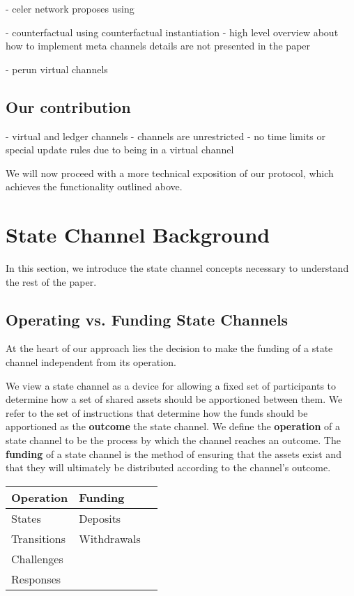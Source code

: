 \documentclass{article}
\begin{document}
- celer network proposes using 

- counterfactual using counterfactual instantiation
- high level overview about how to implement meta channels details are not presented in the paper

- perun virtual channels



\subsection{Our contribution}

- virtual and ledger channels
- channels are unrestricted
- no time limits or special update rules due to being in a virtual channel

We will now proceed with a more technical exposition of our protocol, which achieves the functionality outlined above.

\section{State Channel Background}

In this section, we introduce the state channel concepts necessary to understand the rest of the paper.

\subsection{Operating vs. Funding State Channels}

At the heart of our approach lies the decision to make the funding of a state channel independent from its operation.

We view a state channel as a device for allowing a fixed set of participants to determine how a set of shared assets should be apportioned between them.
We refer to the set of instructions that determine how the funds should be apportioned as the  \textbf{outcome} the state channel.
We define the \textbf{operation} of a state channel to be the process by which the channel reaches an outcome. 
The \textbf{funding} of a state channel is the method of ensuring that the assets exist and that they will ultimately be distributed according to the channel's outcome.

\begin{table}[]
  \begin{tabular}{|l|l|l|}
  \hline
  \textbf{Operation} & \textbf{Funding} \\ \hline
  States &        Deposits \\ 
  Transitions &   Withdrawals \\ 
  Challenges &     \\ 
  Responses &    \\ \hline
  \end{tabular}
  \end{table}
\end{document}
